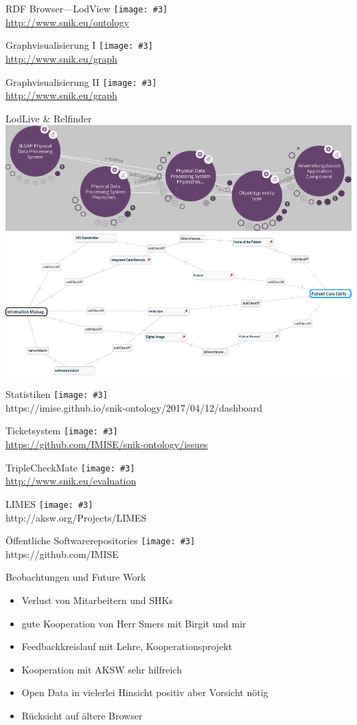 \documentclass{beamer}
\newcommand{\imageslide}[3][]
{
\begin{frame}{#2}
\centering\texttt{[image: \#3]}
\\#1
\end{frame}
}
\begin{document}
\imageslide[\url{http://www.snik.eu/ontology}]{RDF Browser---LodView}{../sniktec/img/browse-cio.png}

\imageslide[\url{http://www.snik.eu/graph}]{Graphvisualisierung I}{../sniktec/img/graph-entitytype.png}
\imageslide[\url{http://www.snik.eu/graph}]{Graphvisualisierung II}{../sniktec/img/graph-erf.png}

\begin{frame}{LodLive \& Relfinder}
\centering
\includegraphics[width=\textwidth]{../sniktec/img/lodlive.png}\\
\includegraphics[width=\textwidth]{../sniktec/img/relfinder.png}
\end{frame}

\imageslide[https://imise.github.io/snik-ontology/2017/04/12/dashboard]{Statistiken}{../sniktec/img/dashboard-medley.png}
\imageslide[\url{https://github.com/IMISE/snik-ontology/issues}]{Ticketsystem}{../sniktec/img/gitissue.png}
\imageslide[\url{http://www.snik.eu/evaluation}]{TripleCheckMate}{../sniktec/img/triplecheckmate.png}

\imageslide[http://aksw.org/Projects/LIMES]{LIMES}{../sniktec/img/limes.png}

\imageslide[https://github.com/IMISE]{Öffentliche Softwarerepositories}{../sniktec/img/github.png}

\begin{frame}{Beobachtungen und Future Work}
\begin{itemize}
\item Verlust von Mitarbeitern und SHKs
\item gute Kooperation von Herr Smers mit Birgit und mir 
\item Feedbackkreislauf mit Lehre, Kooperationsprojekt 
\item Kooperation mit AKSW sehr hilfreich
\item Open Data in vielerlei Hinsicht positiv aber Vorsicht nötig
\item Rücksicht auf ältere Browser 
\end{itemize}
\end{frame}
\end{document}
